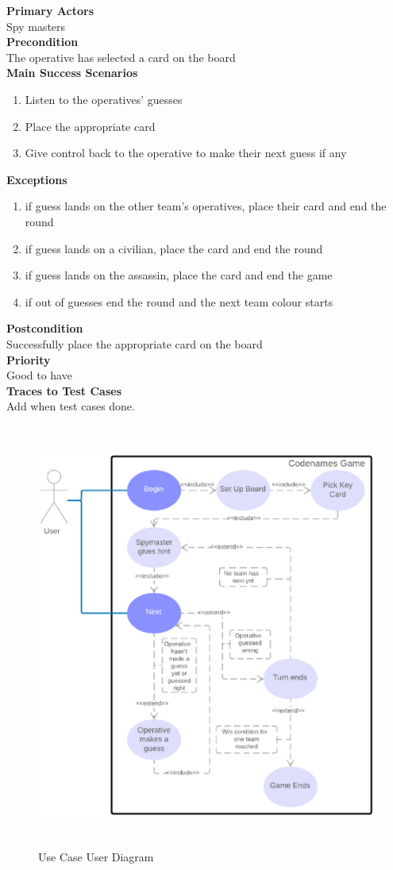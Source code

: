 \documentclass[12pt]{article}
\begin{document}
\noindent
{\bf Primary Actors}\\
Spy masters\\
\noindent
{\bf Precondition}\\
The operative has selected a card on the board\\
\noindent
{\bf Main Success Scenarios}\\
\vspace*{-0.2in}
\begin{enumerate}
\item Listen to the operatives' guesses
\item Place the appropriate card
\item Give control back to the operative to make their next guess if any
\end{enumerate}
\noindent
{\bf Exceptions}
\begin{enumerate}
\item if guess lands on the other team's operatives, place their card and end the round
\item if guess lands on a civilian, place the card and end the round
\item if guess lands on the assassin, place the card and end the game
\item if out of guesses end the round and the next team colour starts
\end{enumerate}
\noindent
{\bf Postcondition}\\
Successfully place the appropriate card on the board\\
\noindent
{\bf Priority}\\
Good to have\\
\noindent
{\bf Traces to Test Cases}\\
Add when test cases done.
\newpage
\begin{figure}[htbp]
\centering
\includegraphics[width=16cm,height=14cm]{user_ucd}
\caption{Use Case User Diagram}
\label{fig:use-case-user}
\end{figure}
\newpage
\end{document}
